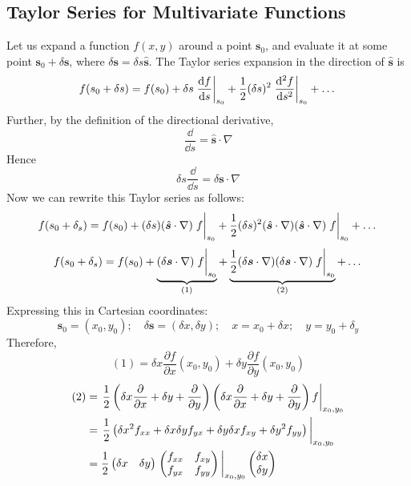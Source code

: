 \documentclass{article}
\begin{document}
	\subsection{Taylor Series for Multivariate Functions}
	Let us expand a function $f(x, y)$ around a point $\bm s_0$, and evaluate it at some point $\bm s_0 + \delta \bm s$, where $\delta \bm s = \delta s \hat{\bm s}$. The Taylor series expansion in the direction of $\hat{\bm s}$ is
	\[ f(s_0 + \delta s) = f(s_0) + \delta s \eval{\frac{\dd f}{\dd s} }_{s_0} + \frac{1}{2} (\delta s)^2\eval{\frac{\dd^2 f}{\dd s^2}}_{s_0} + \dots \]
	Further, by the definition of the directional derivative,
	\[ \frac{\dd}{\dd s} = \hat{\bm s}\cdot \nabla \]
	Hence
	\[ \delta s \frac{\dd}{\dd s} = \delta \bm s \cdot \nabla \]
	Now we can rewrite this Taylor series as follows:
	\[ f(s_0 + \delta_s) = f(s_0) + (\delta s)(\hat{\bm s} \cdot \nabla) \eval{f}_{s_0} + \frac{1}{2}(\delta s)^2(\hat{\bm s} \cdot \nabla)(\hat{\bm s} \cdot \nabla)\eval{f}_{s_0} + \dots \]
	\[ f(s_0 + \delta_s) = f(s_0) + \underbrace{(\delta \bm s \cdot \nabla) \eval{f}_{s_0}}_{(1)} + \underbrace{\frac{1}{2}(\delta \bm s \cdot \nabla)(\delta \bm s \cdot \nabla)\eval{f}_{s_0}}_{(2)} + \dots \]
	Expressing this in Cartesian coordinates:
	\[ \bm s_0 = (x_0, y_0);\quad \delta \bm s = (\delta x, \delta y);\quad x=x_0+\delta x;\quad y=y_0+\delta_y \]
	Therefore,
	\[ (1) = \delta x \frac{\partial f}{\partial x}(x_0, y_0) + \delta y \frac{\partial f}{\partial y}(x_0, y_0) \]
	\begin{align*}
		(2) &= \eval{\frac{1}{2}\left( \delta x \frac{\partial}{\partial x} + \delta y + \frac{\partial}{\partial y} \right)\left( \delta x \frac{\partial}{\partial x} + \delta y + \frac{\partial}{\partial y} \right)f}_{x_0, y_0} \\
		&= \eval{\frac{1}{2}\left( \delta x^2 f_{xx} + \delta x \delta y f_{yx} + \delta y \delta x f_{xy} + \delta y^2 f_{yy} \right)}_{x_0, y_0} \\
		&= \frac{1}{2}\begin{pmatrix}
			\delta x & \delta y
		\end{pmatrix} \eval{\begin{pmatrix}
			f_{xx} & f_{xy} \\
			f_{yx} & f_{yy}
		\end{pmatrix}}_{x_0, y_0} \begin{pmatrix}
			\delta x \\ \delta y
		\end{pmatrix}
	\end{align*}
\end{document}
